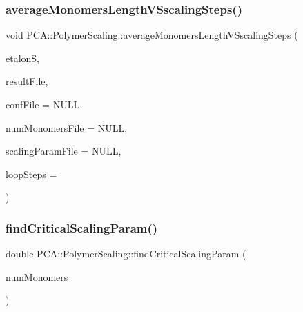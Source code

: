 \subsubsection{\texorpdfstring{average\+Monomers\+Length\+V\+Sscaling\+Steps()}{averageMonomersLengthVSscalingSteps()}}
{\footnotesize\ttfamily void P\+C\+A\+::\+Polymer\+Scaling\+::average\+Monomers\+Length\+V\+Sscaling\+Steps (\begin{DoxyParamCaption}\item[{const \hyperlink{class_p_c_a_1_1_polymer_scaling_1_1_scaling_param}{Scaling\+Param} \&}]{etalonS,  }\item[{F\+I\+LE $\ast$}]{result\+File,  }\item[{F\+I\+LE $\ast$}]{conf\+File = {\ttfamily NULL},  }\item[{F\+I\+LE $\ast$}]{num\+Monomers\+File = {\ttfamily NULL},  }\item[{F\+I\+LE $\ast$}]{scaling\+Param\+File = {\ttfamily NULL},  }\item[{int}]{loop\+Steps = {} }\end{DoxyParamCaption})}

\hypertarget{class_p_c_a_1_1_polymer_scaling_a6188be73e2162d21f113a6cf8cde477b}{}\label{class_p_c_a_1_1_polymer_scaling_a6188be73e2162d21f113a6cf8cde477b} 
\subsubsection{\texorpdfstring{find\+Critical\+Scaling\+Param()}{findCriticalScalingParam()}}
{\footnotesize\ttfamily double P\+C\+A\+::\+Polymer\+Scaling\+::find\+Critical\+Scaling\+Param (\begin{DoxyParamCaption}\item[{int}]{num\+Monomers }\end{DoxyParamCaption})\hspace{0.3cm}{\ttfamily [static]}}

\hypertarget{class_p_c_a_1_1_polymer_scaling_ac58e92df3f25d46f03fe2231dcc1cf33}{}\label{class_p_c_a_1_1_polymer_scaling_ac58e92df3f25d46f03fe2231dcc1cf33} 
